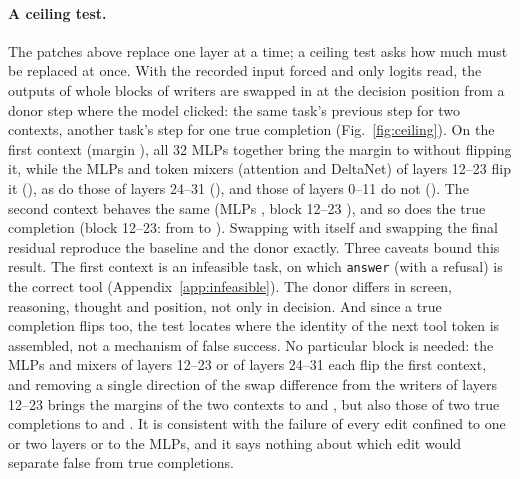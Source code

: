 \paragraph{A ceiling test.} The patches above replace one layer at a time; a ceiling test asks how much must be replaced at once. With the recorded input forced and only logits read, the outputs of whole blocks of writers are swapped in at the decision position from a donor step where the model clicked: the same task's previous step for two \fsp{} contexts, another task's step for one true completion (Fig.~\ref{fig:ceiling}). On the first \fsp{} context (margin \ceilBase), all 32 MLPs together bring the margin to \ceilMlpAll{} without flipping it, while the MLPs and token mixers (attention and DeltaNet) of layers 12--23 flip it (\ceilBothMiddle), as do those of layers 24--31 (\ceilBothLate), and those of layers 0--11 do not (\ceilBothEarly). The second \fsp{} context behaves the same (MLPs \ceilSecMlpAll, block 12--23 \ceilSecBothMiddle), and so does the true completion (block 12--23: from \ceilTrueBase{} to \ceilTrueBothMiddle). Swapping with itself and swapping the final residual reproduce the baseline and the donor exactly. %
Three caveats bound this result. The first \fsp{} context is an infeasible task, on which \texttt{answer} (with a refusal) is the correct tool (Appendix~\ref{app:infeasible}). The donor differs in screen, reasoning, thought and position, not only in decision. And since a true completion flips too, the test locates where the identity of the next tool token is assembled, not a mechanism of false success. No particular block is needed: the MLPs and mixers of layers 12--23 or of layers 24--31 each flip the first context, and removing a single direction of the swap difference from the writers of layers 12--23 brings the margins of the two \fsp{} contexts to \projOneFspA{} and \projOneFspB{}, but also those of two true completions to \projOneTrueA{} and \projOneTrueB. %
 It is consistent with the failure of every edit confined to one or two layers or to the MLPs, and it says nothing about which edit would separate false from true completions.

